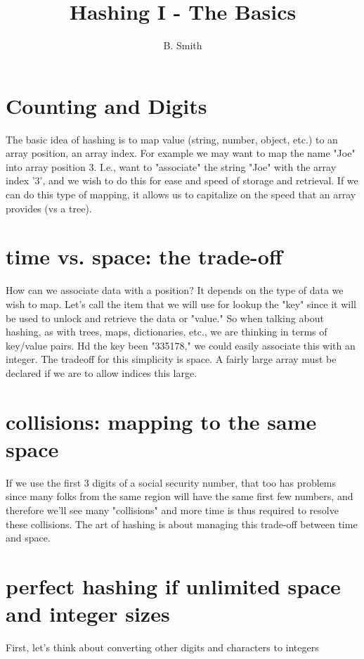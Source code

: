 \documentclass[12pt]{article} %
\title{Hashing I - The Basics}
\author{B. Smith}
\begin{document}
\maketitle

\section{Counting and Digits}


The basic idea of hashing is to map value (string, number, object, etc.) to an array position, an array index.  For example we may want to map the name "Joe" into array position  3.  I.e., want to "associate"  the string "Joe" with the array index '3', and we wish to do this for ease and speed of storage and retrieval.  If we can do this type of mapping, it allows us to capitalize on the speed that an array provides (vs a tree).

\section{time vs. space: the trade-off}
How can we associate data with a position?  It depends on the type of data we wish to map.  Let's call the item that we will use for lookup the "key" since it will be used to unlock and retrieve the data or "value."  So when talking about hashing, as with trees, maps, dictionaries, etc., we are thinking in terms of key/value pairs.  Hd the key been  "335178," we could easily associate this with an integer.  The tradeoff for this simplicity is space.  A fairly large array must be declared if we are to allow indices this large.

\section{collisions: mapping to the same space}
If we use the first 3 digits of a social security number, that too has problems since many folks from the same region will have the same first few numbers, and therefore we'll see many "collisions" and more time is thus required to resolve these collisions.
The art of hashing is about managing this trade-off between time and space.

\section{perfect hashing if unlimited space and integer sizes}
First, let's think about converting other digits and characters to integers
\end{document}
